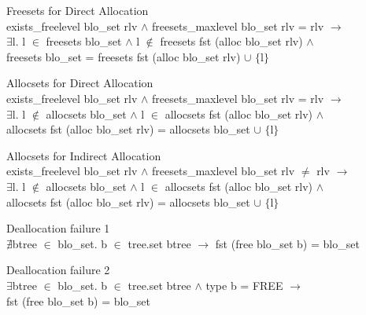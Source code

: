 \documentclass[runningheads]{llncs}
\begin{document}
\begin{definition} {Freesets for Direct Allocation} \\
exists\_freelevel blo\_set rlv $\wedge$ freesets\_maxlevel blo\_set rlv = rlv $\longrightarrow$ \\
\phantom{x} \hspace{10pt} $\exists$l. l $\in$ freesets blo\_set $\wedge$ l $\notin$ freesets fst (alloc blo\_set rlv) $\wedge$ \\
\phantom{x} \hspace{10pt} freesets blo\_set = freesets fst (alloc blo\_set rlv) $\cup$ $\lbrace$l$\rbrace$
\end{definition}

\begin{definition} {Allocsets for Direct Allocation} \\
exists\_freelevel blo\_set rlv $\wedge$ freesets\_maxlevel blo\_set rlv = rlv $\longrightarrow$ \\
\phantom{x} \hspace{10pt} $\exists$l. l $\notin$ allocsets blo\_set $\wedge$ l $\in$ allocsets fst (alloc blo\_set rlv) $\wedge$ \\
\phantom{x} \hspace{10pt} allocsets fst (alloc blo\_set rlv) = allocsets blo\_set $\cup$ $\lbrace$l$\rbrace$
\end{definition}

\begin{definition} {Allocsets for Indirect Allocation} \\
exists\_freelevel blo\_set rlv $\wedge$ freesets\_maxlevel blo\_set rlv $\neq$ rlv $\longrightarrow$ \\
\phantom{x} \hspace{10pt} $\exists$l. l $\notin$ allocsets blo\_set $\wedge$ l $\in$ allocsets fst (alloc blo\_set rlv) $\wedge$ \\
\phantom{x} \hspace{10pt} allocsets fst (alloc blo\_set rlv) = allocsets blo\_set $\cup$ $\lbrace$l$\rbrace$
\end{definition}

\begin{definition} {Deallocation failure 1} \\
$\nexists$btree $\in$ blo\_set. b $\in$ tree.set btree $\longrightarrow$ fst (free blo\_set b) = blo\_set
\end{definition}

\begin{definition} {Deallocation failure 2} \\
$\exists$btree $\in$ blo\_set. b $\in$ tree.set btree $\wedge$ type b = FREE $\longrightarrow$ \\
\phantom{x} \hspace{10pt} fst (free blo\_set b) = blo\_set
\end{definition}
\end{document}
